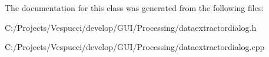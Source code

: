 The documentation for this class was generated from the following files\+:\begin{DoxyCompactItemize}
\item 
C\+:/\+Projects/\+Vespucci/develop/\+G\+U\+I/\+Processing/dataextractordialog.\+h\item 
C\+:/\+Projects/\+Vespucci/develop/\+G\+U\+I/\+Processing/dataextractordialog.\+cpp\end{DoxyCompactItemize}
